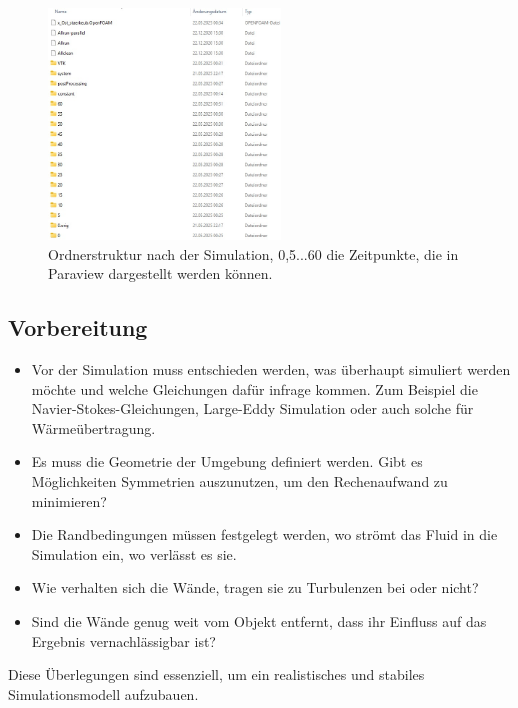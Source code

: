 \begin{figure}
    \centering
    \includegraphics[width=0.55\textwidth]{papers/openfoam/Bilder/Ordnerstruktur_Simuliert.jpg}
    \caption{Ordnerstruktur nach der Simulation, 0,5...60 die Zeitpunkte, die in Paraview dargestellt werden können.}
    \label{fig:ordStrktSim}
\end{figure}


\subsection{Vorbereitung \label{openfoam:section:Vorbereitung}}
\begin{itemize}
    \item Vor der Simulation muss entschieden werden, was überhaupt simuliert werden möchte und welche Gleichungen dafür infrage kommen.
Zum Beispiel die Navier-Stokes-Gleichungen, Large-Eddy Simulation oder auch solche für Wärmeübertragung.
    \item Es muss die Geometrie der Umgebung definiert werden. 
    Gibt es Möglichkeiten Symmetrien auszunutzen, um den Rechenaufwand zu minimieren?
    \item Die Randbedingungen müssen festgelegt werden, wo strömt das Fluid in die Simulation ein, wo verlässt es sie.
    \item Wie verhalten sich die Wände, tragen sie zu Turbulenzen bei oder nicht?
    \item Sind die Wände genug weit vom Objekt entfernt, dass ihr Einfluss auf das Ergebnis vernachlässigbar ist?
\end{itemize} 

Diese Überlegungen sind essenziell, um ein realistisches und stabiles Simulationsmodell aufzubauen.


